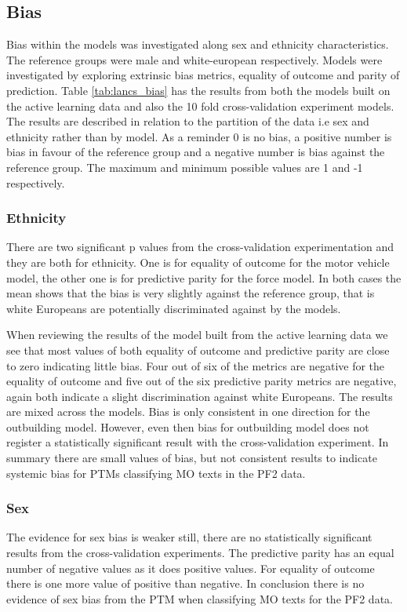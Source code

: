 \subsection{Bias} Bias within the models was investigated along sex and ethnicity characteristics. The reference groups were male and white-european respectively. Models were investigated by exploring extrinsic bias metrics, equality of outcome and parity of prediction. Table \ref{tab:lancs_bias} has the results from both the models built on the active learning data and also the 10 fold cross-validation experiment models. The results are described in relation to the partition of the data i.e sex and ethnicity rather than by model. As a reminder 0 is no bias, a positive number is bias in favour of the reference group and a negative number is bias against the reference group. The maximum and minimum possible values are 1 and -1 respectively.

\subsubsection{Ethnicity} There are two significant p values from the cross-validation experimentation and they are both for ethnicity. One is for equality of outcome for the motor vehicle model, the other one is for predictive parity for the force model. In both cases the mean shows that the bias is very slightly against the reference group, that is white Europeans are potentially discriminated against by the models. 

When reviewing the results of the model built from the active learning data we see that most values of both equality of outcome and predictive parity are close to zero indicating little bias. Four out of six of the metrics are negative for the equality of outcome and five out of the six predictive parity metrics are negative, again both indicate a slight discrimination against white Europeans. The results are mixed across the models. Bias is only consistent in one direction for the outbuilding model. However, even then bias for outbuilding model does not register a statistically significant result with the cross-validation experiment. In summary there are small values of bias, but not consistent results to indicate systemic bias for PTMs classifying MO texts in the PF2 data.
 
\subsubsection{Sex} The evidence for sex bias is weaker still, there are no statistically significant results from the cross-validation experiments. The predictive parity has an equal number of negative values as it does positive values. For equality of outcome there is one more value of positive than negative. In conclusion there is no evidence of sex bias from the PTM when classifying MO texts for the PF2 data.

